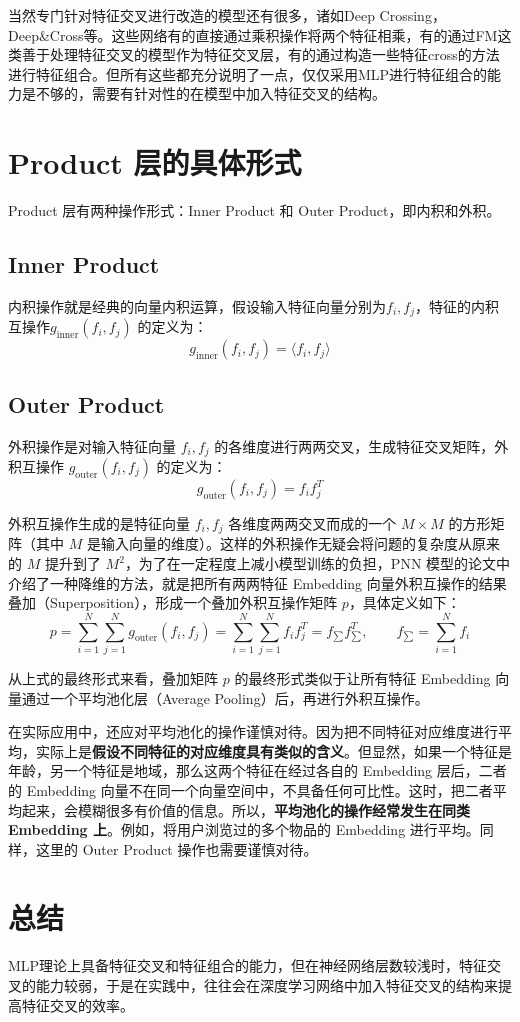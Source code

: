 \documentclass[12pt]{article}
\begin{document}
当然专门针对特征交叉进行改造的模型还有很多，诸如Deep Crossing，Deep\&Cross等。这些网络有的直接通过乘积操作将两个特征相乘，有的通过FM这类善于处理特征交叉的模型作为特征交叉层，有的通过构造一些特征cross的方法进行特征组合。但所有这些都充分说明了一点，仅仅采用MLP进行特征组合的能力是不够的，需要有针对性的在模型中加入特征交叉的结构。

\section{Product 层的具体形式}
Product 层有两种操作形式：Inner Product 和 Outer Product，即内积和外积。

\subsection{Inner Product}
内积操作就是经典的向量内积运算，假设输入特征向量分别为$f_i, f_j$，特征的内积互操作$g_{\text{inner}}(f_i, f_j)$ 的定义为：
$$
g_{\text{inner}}(f_i, f_j) = \langle f_i, f_j \rangle
$$

\subsection{Outer Product}
外积操作是对输入特征向量 $f_i, f_j$ 的各维度进行两两交叉，生成特征交叉矩阵，外积互操作 $g_{\text{outer}}(f_i, f_j)$ 的定义为：
$$
g_{\text{outer}}(f_i, f_j) = f_i f_j^T
$$

外积互操作生成的是特征向量 $f_i, f_j$ 各维度两两交叉而成的一个 $M \times M$ 的方形矩阵（其中 $M$ 是输入向量的维度）。这样的外积操作无疑会将问题的复杂度从原来的 $M$ 提升到了 $M^2$，为了在一定程度上减小模型训练的负担，PNN 模型的论文中介绍了一种降维的方法，就是把所有两两特征 Embedding 向量外积互操作的结果叠加（Superposition），形成一个叠加外积互操作矩阵 $p$，具体定义如下：
$$
p = \sum_{i=1}^N\sum_{j=1}^N g_{\text{outer}}(f_i, f_j) = \sum_{i=1}^N\sum_{j=1}^N f_i f_j^T = f_{\sum}f_{\sum}^T,  \qquad f_{\sum} = \sum_{i=1}^Nf_i
$$

从上式的最终形式来看，叠加矩阵 $p$ 的最终形式类似于让所有特征 Embedding 向量通过一个平均池化层（Average Pooling）后，再进行外积互操作。

在实际应用中，还应对平均池化的操作谨慎对待。因为把不同特征对应维度进行平均，实际上是\textbf{假设不同特征的对应维度具有类似的含义}。但显然，如果一个特征是年龄，另一个特征是地域，那么这两个特征在经过各自的 Embedding 层后，二者的 Embedding 向量不在同一个向量空间中，不具备任何可比性。这时，把二者平均起来，会模糊很多有价值的信息。所以，\textbf{平均池化的操作经常发生在同类 Embedding 上}。例如，将用户浏览过的多个物品的 Embedding 进行平均。同样，这里的 Outer Product 操作也需要谨慎对待。

\section{总结}
MLP理论上具备特征交叉和特征组合的能力，但在神经网络层数较浅时，特征交叉的能力较弱，于是在实践中，往往会在深度学习网络中加入特征交叉的结构来提高特征交叉的效率。






\end{document}
